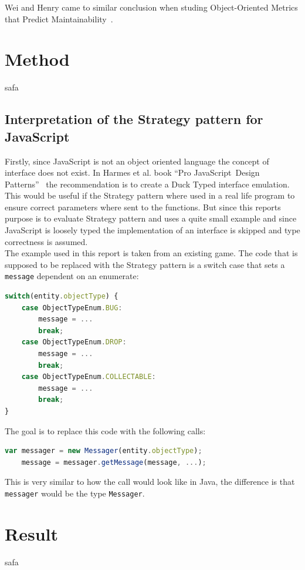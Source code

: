 \documentclass[conference, a4paper]{IEEEtran}
\begin{document}
Wei and Henry came to similar conclusion when studing Object-Oriented Metrics that Predict Maintainability~\cite{bibitem:WeiHenry}.
\\
\section{Method}
safa
\\
\subsection{Interpretation of the Strategy pattern for JavaScript}
Firstly, since JavaScript is not an object oriented language the concept of interface does not exist. In Harmes et al. book ``Pro JavaScript\texttrademark~Design Patterns''~\cite{bibitem:DiazHarmes} the recommendation is to create a Duck Typed interface emulation. This would be useful if the Strategy pattern where used in a real life program to ensure correct parameters where sent to the functions. But since this reports purpose is to evaluate Strategy pattern and uses a quite small example and since JavaScript is loosely typed the implementation of an interface is skipped and type correctness is assumed.
\\
The example used in this report is taken from an existing game. The code that is supposed to be replaced with the Strategy pattern is a switch case that sets a \texttt{message} dependent on an enumerate:
\begin{lstlisting}[language=JavaScript, label=lst:switch-case, caption=The original switch case.]
switch(entity.objectType) {
	case ObjectTypeEnum.BUG:
		message = ...
		break;
	case ObjectTypeEnum.DROP:
		message = ...
		break;
	case ObjectTypeEnum.COLLECTABLE:
		message = ...
		break;
}
\end{lstlisting}
The goal is to replace this code with the following calls:
\begin{lstlisting}[language=JavaScript, label=lst:switch-case, caption=Switch case replaced trough the Strategy pattern.]
	var messager = new Messager(entity.objectType);
	message = messager.getMessage(message, ...);
\end{lstlisting}
This is very similar to how the call would look like in Java, the difference is that \texttt{messager} would be the type \texttt{Messager}.
\section{Result}
safa
\\
\end{document}
